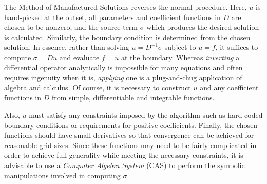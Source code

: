 The Method of Manufactured Solutions reverses the normal procedure.
Here, $u$ is hand-picked at the outset, all parameters and coefficient functions in $D$ are chosen to be nonzero, and the source term $\sigma$ which produces the desired solution is calculated.
Similarly, the boundary condition is determined from the chosen solution.
In essence, rather than solving $u = D^{-1}\sigma$ subject to $u=f$, it suffices to compute $\sigma = Du$ and evaluate $f=u$ at the boundary.
Whereas \textit{inverting} a differential operator analytically is impossible for many equations and often requires ingenuity when it is, \textit{applying} one is a plug-and-chug application of algebra and calculus.
Of course, it is necessary to construct $u$ and any coefficient functions in $D$ from simple, differentiable and integrable functions.

Also, $u$ must satisfy any constraints imposed by the algorithm such as hard-coded boundary conditions or requirements for positive coefficients.
Finally, the chosen functions should have small derivatives so that convergence can be achieved for reasonable grid sizes.
Since these functions may need to be fairly complicated in order to achieve full generality while meeting the necessary constraints, it is advisable to use a \textit{Computer Algebra System} (CAS) to perform the symbolic manipulations involved in computing $\sigma$.


